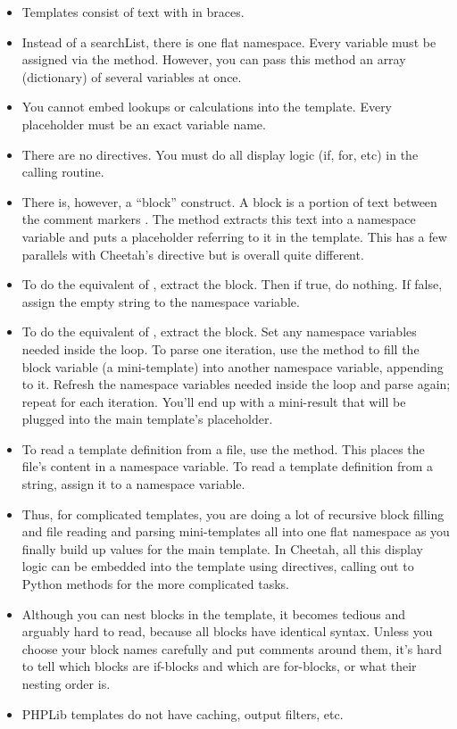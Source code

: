 \begin{itemize}
\item Templates consist of text with  in braces.
\item Instead of a searchList, there is one flat namespace.  Every variable
     must be assigned via the  method.  However, you can pass
     this method an array (dictionary) of several variables at once.
\item You cannot embed lookups or calculations into the template.  Every
     placeholder must be an exact variable name.
\item There are no directives.  You must do all display logic (if, for, etc)
     in the calling routine.  
\item There is, however, a ``block'' construct.  A block is a portion of text
     between the comment markers .  The  method extracts this text
     into a namespace variable and puts a placeholder referring to it in the
     template.  This has a few parallels with Cheetah's 
     directive but is overall quite different.  
\item To do the equivalent of , extract the block. Then if true, do
     nothing.  If false, assign the empty string to the namespace variable.
\item To do the equivalent of , extract the block.  Set any
     namespace variables needed inside the loop.  To parse one iteration, use
     the  method to fill the block variable (a mini-template) into
     another namespace variable, appending to it.  Refresh the namespace
     variables needed inside the loop and parse again; repeat for each
     iteration.  You'll end up with a mini-result that will be plugged into the
     main template's placeholder.
\item To read a template definition from a file, use the 
     method.  This places the file's content in a namespace variable.
     To read a template definition from a string, assign it to a namespace
     variable.
\item Thus, for complicated templates, you are doing a lot of recursive block
     filling and file reading and parsing mini-templates all into one flat
     namespace as you finally build up values for the main template.  In
     Cheetah, all this display logic can be embedded into the template using
     directives, calling out to Python methods for the more complicated tasks.
\item Although you can nest blocks in the template, it becomes tedious and
     arguably hard to read, because all blocks have identical syntax.  Unless
     you choose your block names carefully and put comments around them, it's
     hard to tell which blocks are if-blocks and which are for-blocks, or what
     their nesting order is.
\item PHPLib templates do not have caching, output filters, etc.
\end{itemize}

